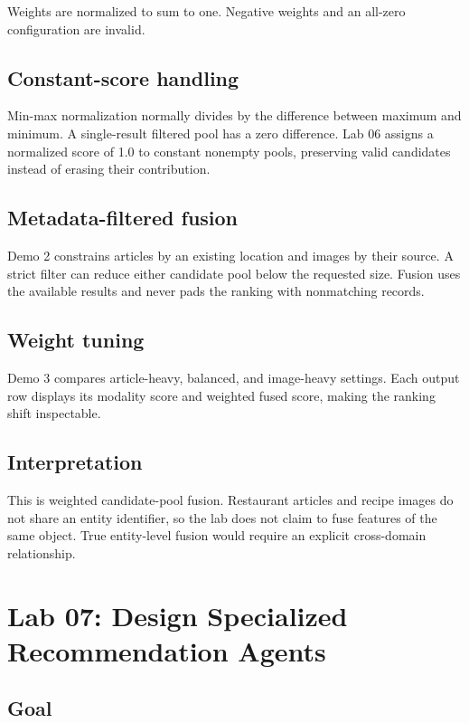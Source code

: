 \documentclass[11pt]{article}
\begin{document}
Weights are normalized to sum to one. Negative weights and an all-zero
configuration are invalid.

\subsection{Constant-score handling}

Min-max normalization normally divides by the difference between maximum and
minimum. A single-result filtered pool has a zero difference. Lab 06 assigns a
normalized score of 1.0 to constant nonempty pools, preserving valid candidates
instead of erasing their contribution.

\subsection{Metadata-filtered fusion}

Demo 2 constrains articles by an existing location and images by their source.
A strict filter can reduce either candidate pool below the requested size.
Fusion uses the available results and never pads the ranking with nonmatching
records.

\subsection{Weight tuning}

Demo 3 compares article-heavy, balanced, and image-heavy settings. Each output
row displays its modality score and weighted fused score, making the ranking
shift inspectable.

\subsection{Interpretation}

This is weighted candidate-pool fusion. Restaurant articles and recipe images
do not share an entity identifier, so the lab does not claim to fuse features
of the same object. True entity-level fusion would require an explicit
cross-domain relationship.

\section{Lab 07: Design Specialized Recommendation Agents}

\subsection{Goal}
\end{document}
